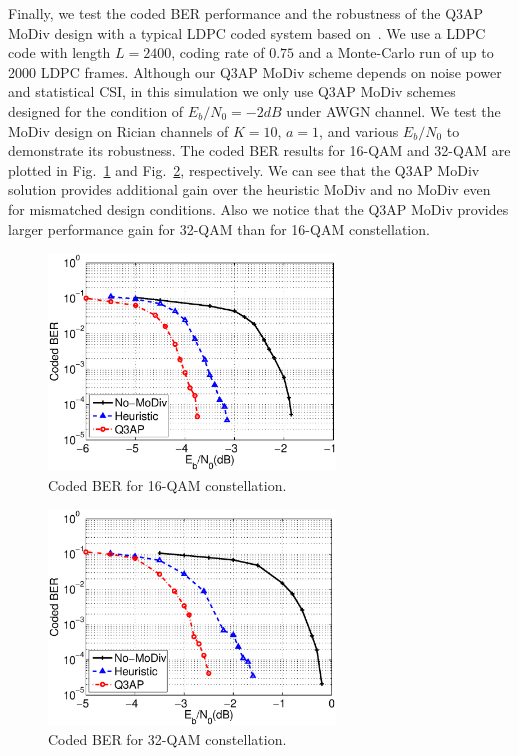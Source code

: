 \documentclass[journal]{IEEEtran}
\begin{document}
Finally, we test the coded BER performance and the robustness of the Q3AP MoDiv
design with a typical LDPC coded system based on~\cite{hochwald2003achieving}.
We use a LDPC code with length $L=2400$, coding rate of $0.75$ and a
Monte-Carlo run of up to 2000 LDPC frames. Although our Q3AP MoDiv scheme
depends on noise power and statistical CSI, in this simulation we only use Q3AP
MoDiv schemes designed for the condition of $E_b/N_0=-2dB$ under AWGN channel.
We test the MoDiv design on Rician channels of $K=10$, $a=1$, and various
$E_b/N_0$ to demonstrate its robustness. The coded BER results for 16-QAM and
32-QAM are plotted in Fig.~\ref{fig:coded_BER16QAM} and
Fig.~\ref{fig:coded_BER32QAM}, respectively. We can see that the Q3AP MoDiv
solution provides additional gain over the heuristic MoDiv and no MoDiv even for
mismatched design conditions. Also we notice that the Q3AP MoDiv provides larger
performance gain for 32-QAM than for 16-QAM constellation.

\begin{figure}[!t]
    \centering
    \includegraphics[width=3.0in]{./figs/coded_BER16QAM.eps}
    \caption{Coded BER for 16-QAM constellation.}
    \label{fig:coded_BER16QAM}
\end{figure}

\begin{figure}[!t]
    \centering
    \includegraphics[width=3.0in]{./figs/coded_BER32QAM.eps}
    \caption{Coded BER for 32-QAM constellation.}
    \label{fig:coded_BER32QAM}
\end{figure}
\end{document}
